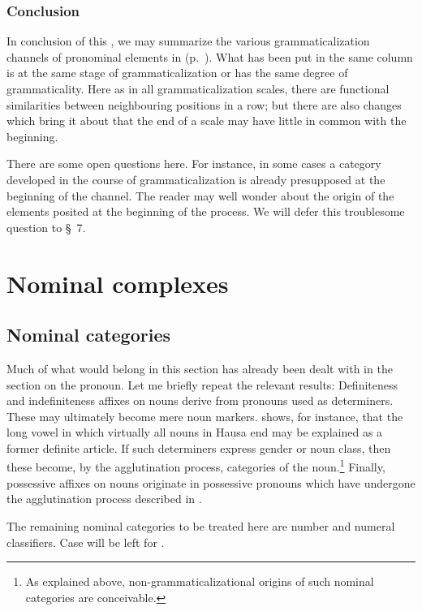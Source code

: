 \subsubsection{Conclusion}
In conclusion of this , we may summarize the various grammaticalization channels of pronominal elements in  (p.~\pageref{interrelatedpronomel}).
What has been put in the same column is at the same stage of grammaticalization or has the same degree of grammaticality. Here as in all grammaticalization scales, there are functional similarities between neighbouring positions in a row; but there are also changes which bring it about that the end of a scale may have little in common with the beginning.

There are some open questions here. For instance, in some cases a category developed in the course of grammaticalization is already presupposed at the beginning of the channel. The reader may well wonder about the origin of the elements posited at the beginning of the process. We will defer this troublesome question to §~7.

\section{Nominal complexes}
\subsection{Nominal categories}

Much of what would belong in this section has already been dealt with in the section on the pronoun. Let me briefly repeat the relevant results: Definiteness and indefiniteness affixes on nouns derive from pronouns used as determiners. These may ultimately become mere noun markers.\label{page59} \citet[§~5.3]{Greenberg1978} shows, for instance, that the long vowel in which virtually all nouns in Hausa end may be explained as a former definite article. If such determiners express gender or noun class, then these become, by the agglutination process, categories of the noun.\footnote{As explained above, non-grammaticalizational origins of such nominal categories are conceivable.} Finally, possessive affixes on nouns originate in possessive pronouns which have undergone the agglutination process described in .

The remaining nominal categories to be treated here are number and numeral classifiers. Case will be left for .

